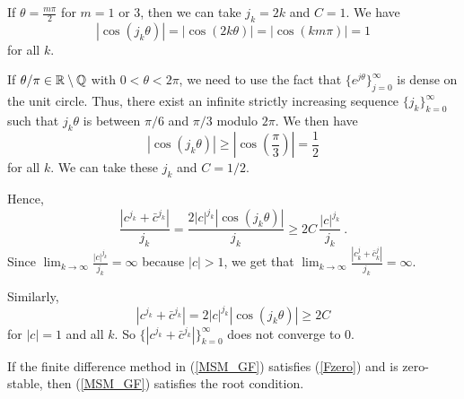 \begin{rmkList}
\begin{enumerate}
If $\displaystyle \theta = \frac{m \pi}{2}$ for $m=1$ or $3$, then
we can take $j_k = 2k$ and $C = 1$.  We have
\[
  |\cos(j_k \theta)| = |\cos( 2k\theta)| = |\cos(k m \pi)| = 1
\]
for all $k$.

If $\theta/\pi \in \mathbb{R} \setminus \mathbb{Q}$ with $0 < \theta < 2\pi$, we
need to use the fact that $\{ e^{j\theta} \}_{j=0}^\infty$ is dense on
the unit circle.  Thus, there exist an infinite strictly increasing sequence
$\{j_k\}_{k=0}^\infty$ such that $j_k \theta$ is between $\pi/6$ and
$\pi/3$ modulo $2\pi$.  We then have
\[
  |\cos(j_k \theta)|
  \geq \left|\cos\left(\frac{\pi}{3}\right)\right| = \frac{1}{2}
\]
for all $k$.  We can take these $j_k$ and $C = 1/2$.

Hence,
\[
\frac{|c^{j_k}+\bar{c}^{j_k}|}{j_k}
= \frac{2|c|^{j_k} |\cos(j_k \theta)|}{j_k}
\geq 2C\, \frac{|c|^{j_k}}{j_k} \ .
\]
Since $\displaystyle \lim_{k\to \infty} \frac{|c|^{j_k}}{j_k} = \infty$
because $|c|>1$, we get that
$\displaystyle \lim_{k\to \infty} \frac{|c^j_k+\bar{c}^j_k|}{j_k} = \infty$.

Similarly,
\[
  |c^{j_k}+\bar{c}^{j_k}| = 2|c|^{j_k} |\cos(j_k \theta)|
  \geq 2C
\]
for $|c|=1$ and all $k$.  So
$\displaystyle \{|c^{j_k}+\bar{c}^{j_k}|\}_{k=0}^\infty$ does not
converge to $0$.
\end{enumerate}
\label{cjdiverges}
\end{rmkList}

\begin{prop}
If the finite difference method in (\ref{MSM_GF}) satisfies (\ref{Fzero})
and is zero-stable, then (\ref{MSM_GF}) satisfies the root
condition. \label{ZeroStabRootCond}
\end{prop}

